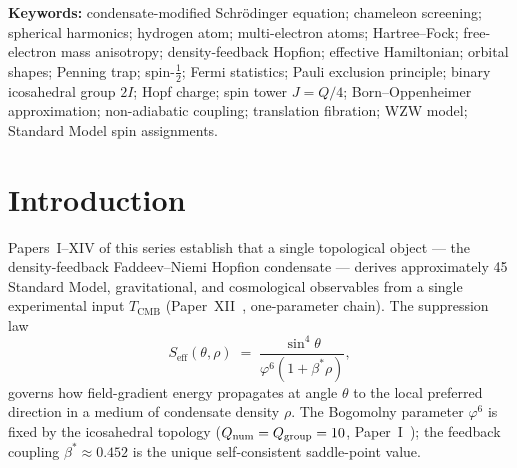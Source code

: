 \documentclass[11pt,a4paper]{article}
\theoremstyle{definition}
\theoremstyle{remark}
\newcommand{\vp}{\varphi}
\newcommand{\bst}{\beta^{*}}
\newcommand{\TCMB}{T_{\mathrm{CMB}}}
\newcommand{\Seff}{S_{\mathrm{eff}}}
\begin{document}
\begin{abstract}
Finally, the fermionic nature of the electron is derived from the
condensate topology.
The binary icosahedral group $2I$, the symmetry group of the condensate
(Paper~I), is a double cover of the icosahedral group $I$.
The $Q=2$ gradient-knot transforms in the fundamental spinor representation
of $2I$: the central element $z$ (the $2\pi$ rotation) acts as $-1$,
giving spin $J=\tfrac{1}{2}$ (Theorem~\ref{P13:thm:spin_half}),
Fermi statistics (Corollary~\ref{P13:cor:fermi_stats}), and
Pauli exclusion (Corollary~\ref{P13:cor:pauli_exclusion}).
This is the same $\mathbb{Z}_2$ structure that underlies the
colour level shift $\delta n^{(C)}=\tfrac{1}{2}$ of Paper~V.\end{abstract}

\footnotesize
\noindent\textbf{Keywords:} condensate-modified Schr\"odinger equation;
chameleon screening; spherical harmonics; hydrogen atom; multi-electron atoms;
Hartree--Fock; free-electron mass anisotropy; density-feedback Hopfion;
effective Hamiltonian; orbital shapes; Penning trap;
spin-$\tfrac{1}{2}$; Fermi statistics; Pauli exclusion principle;
binary icosahedral group $2I$; Hopf charge; spin tower $J=Q/4$;
Born--Oppenheimer approximation; non-adiabatic coupling;
translation fibration; WZW model; Standard Model spin assignments.
\normalsize

\tableofcontents
\bigskip

\newpage
\section{Introduction}
\label{P13:sec:intro}

Papers~I--XIV of this series establish that a single topological object
--- the density-feedback Faddeev--Niemi Hopfion condensate --- derives
approximately 45 Standard Model, gravitational, and cosmological
observables from a single experimental input $\TCMB$
(Paper~XII~\cite{Paper12}, one-parameter chain).
The suppression law
\begin{equation}
  \Seff(\theta,\rho)
  \;=\; \frac{\sin^4\!\theta}{\vp^6(1+\bst\rho)},
  \label{P13:eq:suppression}
\end{equation}
governs how field-gradient energy propagates at angle $\theta$ to
the local preferred direction in a medium of condensate density $\rho$.
The Bogomolny parameter $\vp^6$ is fixed by the icosahedral topology
($Q_{\rm num}=Q_{\rm group}=10$, Paper~I~\cite{Paper1});
the feedback coupling $\bst\approx0.452$ is the unique
self-consistent saddle-point value.
\end{document}
